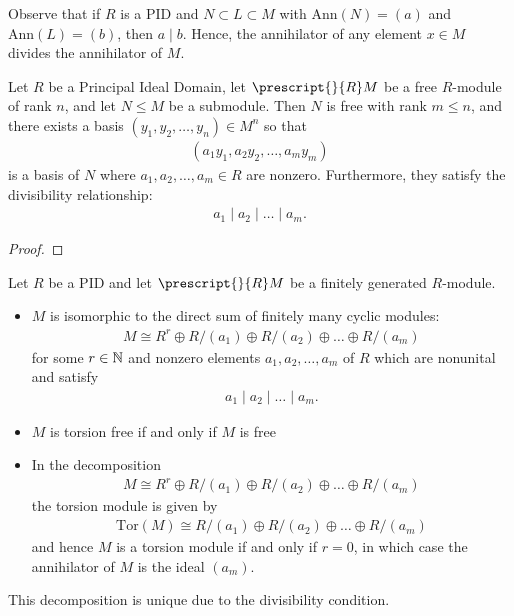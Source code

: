 \documentclass{memoir}
\begin{document}
Observe that if \(R\) is a PID and \(N\subset L\subset M\) with \(\textrm{Ann}(N) = (a)\) and \(\textrm{Ann}(L) = (b)\), then \(a\mid b\). Hence, the annihilator of any element \(x \in M\) divides the annihilator of \(M\).

\begin{thm}
	Let \(R\) be a Principal Ideal Domain, let \(\prescript{}{R}M\) be a free \(R\)-module of rank \(n\), and let \(N\leq M\) be a submodule. Then \(N\) is free with rank \(m\leq n\), and there exists a basis \((y_1,y_2,\ldots,y_n) \in M^{n}\) so that
	\begin{align*}
		(a_1y_1,a_2y_2,\ldots,a_my_m)
	\end{align*} is a basis of \(N\) where \(a_1,a_2,\ldots,a_m \in R\) are nonzero. Furthermore, they satisfy the divisibility relationship:
	\begin{align*}
		a_1 \mid  a_2 \mid \ldots \mid a_m.
	\end{align*}
\end{thm}

\begin{proof}
	
\end{proof}

\begin{thm}
	Let \(R\) be a PID and let \(\prescript{}{R}M\) be a finitely generated \(R\)-module.
	\begin{itemize}
		\item \(M\) is isomorphic to the direct sum of finitely many cyclic modules:
			\begin{align*}
				M \cong R^{r} \oplus R / (a_1) \oplus R / (a_2) \oplus \ldots \oplus R / (a_m)
			\end{align*}
			for some \(r \in \mathbb{N}\) and nonzero elements \(a_1,a_2,\ldots,a_m\) of \(R\) which are nonunital and satisfy
			\begin{align*}
				a_1 \mid a_2 \mid \ldots \mid a_m.
			\end{align*}
		\item \(M\) is torsion free if and only if \(M\) is free
		\item In the decomposition
			\begin{align*}
				M \cong R^{r} \oplus R / (a_1) \oplus R / (a_2) \oplus \ldots \oplus R / (a_m)
			\end{align*}
			the torsion module is given by
			\begin{align*}
				\textrm{Tor}(M) \cong R / (a_1) \oplus R / (a_2) \oplus \ldots \oplus R / (a_m)
			\end{align*}
			and hence \(M\) is a torsion module if and only if \(r = 0\), in which case the annihilator of \(M\) is the ideal \((a_m)\).
	\end{itemize}
\end{thm}
This decomposition is unique due to the divisibility condition.
\end{document}
